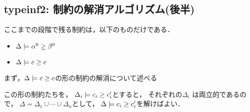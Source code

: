 
\subsection{typeinf2: 制約の解消アルゴリズム(後半)}
ここまでの段階で残る制約は，以下のものだけである．
\begin{itemize}
\item $\Delta \models {\alpha^0} \ge {\beta^0}$
\item $\Delta \models {c} \ge {c}$
\end{itemize}

まず，$\Delta \models {c} \ge {c}$の形の制約の解消について述べる

この形の制約たちを，
$\Delta_i \models {c_i} \ge {c'_i}$とすると，
それぞれの$\Delta_i$ は両立的であるので，
$\Delta = \Delta_1 \cup \cdots \cup \Delta_n$として，
$\Delta \models {c_i} \ge {c'_i}$を解けばよい．

